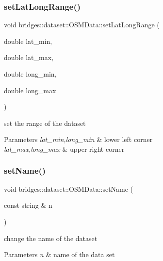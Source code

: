 \subsubsection{\texorpdfstring{set\+Lat\+Long\+Range()}{setLatLongRange()}\hspace{0.1cm}{\footnotesize\ttfamily [2/2]}}
{\footnotesize\ttfamily void bridges\+::dataset\+::\+O\+S\+M\+Data\+::set\+Lat\+Long\+Range (\begin{DoxyParamCaption}\item[{double}]{lat\+\_\+min,  }\item[{double}]{lat\+\_\+max,  }\item[{double}]{long\+\_\+min,  }\item[{double}]{long\+\_\+max }\end{DoxyParamCaption})\hspace{0.3cm}{\ttfamily [inline]}}



set the range of the dataset 


\begin{DoxyParams}{Parameters}
{\em lat\+\_\+min,long\+\_\+min} & lower left corner \\
\hline
{\em lat\+\_\+max,long\+\_\+max} & upper right corner \\
\hline
\end{DoxyParams}
\mbox{\label{classbridges_1_1dataset_1_1_o_s_m_data_aba68aa38305990876b4dbe5c92764ffd}} 
\subsubsection{\texorpdfstring{set\+Name()}{setName()}}
{\footnotesize\ttfamily void bridges\+::dataset\+::\+O\+S\+M\+Data\+::set\+Name (\begin{DoxyParamCaption}\item[{const string \&}]{n }\end{DoxyParamCaption})\hspace{0.3cm}{\ttfamily [inline]}}



change the name of the dataset 


\begin{DoxyParams}{Parameters}
{\em n} & name of the data set \\
\hline
\end{DoxyParams}
\mbox{\label{classbridges_1_1dataset_1_1_o_s_m_data_aa146cdbf046fa06cd16f654518e3f4e2}} 
